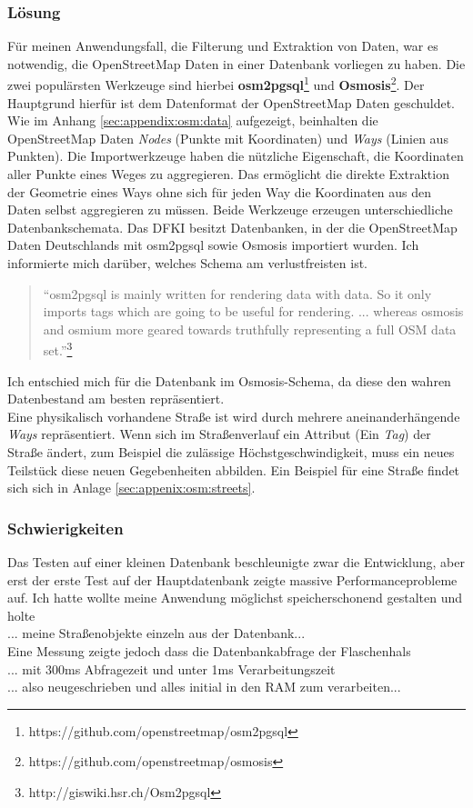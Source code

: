 \subsubsection{Lösung}
Für meinen Anwendungsfall, die Filterung und Extraktion von Daten, war es notwendig, die OpenStreetMap Daten in einer Datenbank vorliegen zu haben.
Die zwei populärsten Werkzeuge sind hierbei \textbf{osm2pgsql}\footnote{https://github.com/openstreetmap/osm2pgsql} und \textbf{Osmosis}\footnote{https://github.com/openstreetmap/osmosis}.
Der Hauptgrund hierfür ist dem Datenformat der OpenStreetMap Daten geschuldet. Wie im Anhang \ref{sec:appendix:osm:data} aufgezeigt, beinhalten die OpenStreetMap Daten \textit{Nodes} (Punkte mit Koordinaten) und \textit{Ways} (Linien aus Punkten). Die Importwerkzeuge haben die nützliche Eigenschaft, die Koordinaten aller Punkte eines Weges zu aggregieren.
Das ermöglicht die direkte Extraktion der Geometrie eines Ways ohne sich für jeden Way die Koordinaten aus den Daten selbst aggregieren zu müssen.
Beide Werkzeuge erzeugen unterschiedliche Datenbankschemata.
Das DFKI besitzt Datenbanken, in der die OpenStreetMap Daten Deutschlands mit osm2pgsql sowie Osmosis importiert wurden.
Ich informierte mich darüber, welches Schema am verlustfreisten ist.
\begin{quote}
``osm2pgsql is mainly written for rendering data with data. So it only imports tags which are going to be useful for rendering. ... whereas osmosis and osmium more geared towards truthfully representing a full OSM data set.''\footnote{http://giswiki.hsr.ch/Osm2pgsql}
\end{quote}
Ich entschied mich für die Datenbank im Osmosis-Schema, da diese den wahren Datenbestand am besten repräsentiert.\\
Eine physikalisch vorhandene Straße ist wird durch mehrere aneinanderhängende \textit{Ways} repräsentiert.
Wenn sich im Straßenverlauf ein Attribut (Ein \textit{Tag}) der Straße ändert, zum Beispiel die zulässige Höchstgeschwindigkeit, muss ein neues Teilstück diese neuen Gegebenheiten abbilden. Ein Beispiel für eine Straße findet sich sich in Anlage \ref{sec:appenix:osm:streets}.
 
\subsubsection{Schwierigkeiten}
Das Testen auf einer kleinen Datenbank beschleunigte zwar die Entwicklung, aber erst der erste Test auf der Hauptdatenbank zeigte massive Performanceprobleme auf.
Ich hatte wollte meine Anwendung möglichst speicherschonend gestalten und holte \\... meine Straßenobjekte einzeln aus der Datenbank...\\ Eine Messung zeigte jedoch dass die Datenbankabfrage der Flaschenhals \\... mit 300ms Abfragezeit und unter 1ms Verarbeitungszeit\\... also neugeschrieben und alles initial in den RAM zum verarbeiten...

